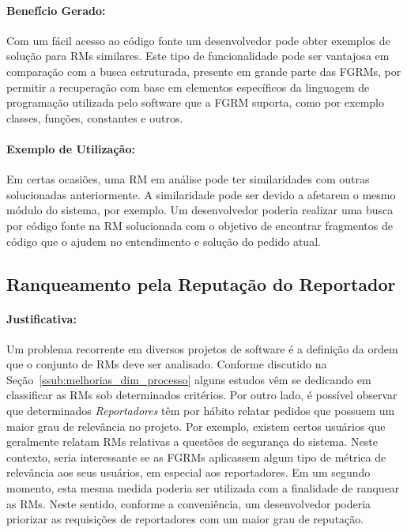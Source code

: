 \paragraph{Benefício Gerado:}\label{par:beneficios_s02}

Com um fácil acesso ao código fonte um desenvolvedor pode obter exemplos de
solução para RMs similares. Este tipo de funcionalidade pode ser vantajosa em
comparação com a busca estruturada, presente em grande parte das FGRMs, por
permitir a recuperação com base em elementos específicos da linguagem de
programação utilizada pelo software que a FGRM suporta, como por exemplo
classes, funções, constantes e outros.

\paragraph{Exemplo de Utilização:}\label{par:exemplo_s02}

Em certas ocasiões, uma RM em análise pode ter similaridades com outras
solucionadas anteriormente. A similaridade pode ser devido a afetarem o mesmo
módulo do sistema, por exemplo. Um desenvolvedor poderia realizar uma busca por
código fonte na RM solucionada com o objetivo de encontrar fragmentos de código
que o ajudem no entendimento e solução do pedido atual.

\subsection{Ranqueamento pela Reputação do Reportador}\label{sub:diferenciacao_do_reportdor}


\paragraph{Justificativa:}\label{par:justificativa_s03}

Um problema recorrente em diversos projetos de software é a definição da ordem
que o conjunto de RMs deve ser analisado. Conforme discutido na
Seção~\ref{ssub:melhorias_dim_processo} alguns estudos vêm se dedicando em
classificar as RMs sob determinados critérios. Por outro lado, é possível
observar que determinados \textit{Reportadores} têm por hábito relatar pedidos
que possuem um maior grau de relevância no projeto. Por exemplo, existem certos
usuários que geralmente relatam RMs relativas a questões de segurança do
sistema. Neste contexto, seria interessante se as FGRMs aplicassem algum tipo
de métrica de relevância aos seus usuários, em especial aos reportadores. Em um
segundo momento, esta mesma medida poderia ser utilizada com a finalidade de
ranquear as RMs. Neste sentido, conforme a conveniência, um desenvolvedor
poderia priorizar as requisições de reportadores com um maior grau de
reputação.

